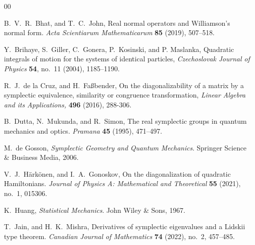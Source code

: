 \documentclass[preprint,12pt]{elsarticle}
\begin{document}
\begin{thebibliography}{00}




B.~V.~R.~Bhat, and T.~C.~John, Real normal operators and {W}illiamson’s normal form. \emph{Acta Scientiarum Mathematicarum} \textbf{85} (2019), 507--518.









Y.~Brihaye, S.~Giller, C.~Gonera, P.~Kosinski, and P. Maslanka, Quadratic integrals of motion for the systems of identical particles, \emph{Czechoslovak Journal of Physics} \textbf{54}, no.~11 (2004), 1185--1190.

R.~J.~de la Cruz, and H.~Faßbender, On the diagonalizability of a matrix by a symplectic equivalence, similarity or congruence transformation, \emph{Linear Algebra and its Applications,} \textbf{496} (2016), 288-306.

B.~Dutta, N.~Mukunda, and R.~Simon, The real symplectic groups in quantum mechanics and optics.
\emph{Pramana} \textbf{45} (1995), 471--497.


M.~de Gosson, \emph{Symplectic Geometry and Quantum Mechanics}.
Springer Science \& Business Media, 2006.




V.~J.~Härkönen, and I.~A.~Gonoskov, On the diagonalization of quadratic {H}amiltonians. \emph{Journal of Physics A: Mathematical and Theoretical} \textbf{55} (2021), no.~1, 015306.




K.~Huang, \emph{Statistical Mechanics}. John Wiley \& Sons, 1967.






T.~Jain, and H.~K.~Mishra, Derivatives of symplectic eigenvalues and a Lidskii type theorem.
\emph{Canadian Journal of Mathematics} \textbf{74} (2022), no.~2, 457--485.















\end{thebibliography}
\end{document}
